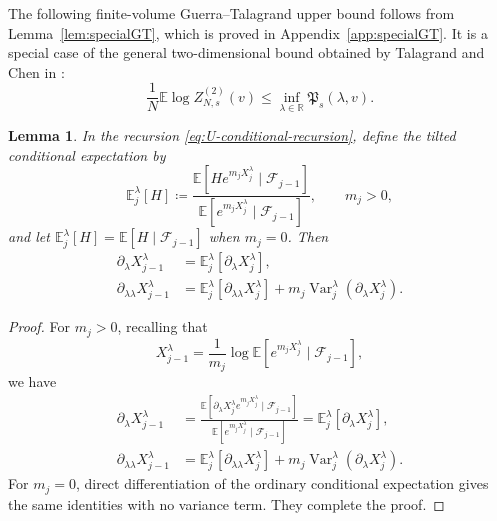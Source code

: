 \documentclass[11pt]{article}
\newtheorem{lemma}[theorem]{Lemma}
\numberwithin{equation}{section}
\newcommand{\E}{\mathbb{E}}
\newcommand{\1}{\mathbf 1}
\newcommand{\cK}{\mathcal K}
\begin{document}
The following finite-volume Guerra--Talagrand upper bound follows from Lemma~\ref{lem:specialGT}, which is proved in Appendix~\ref{app:specialGT}. It is a special case of the general two-dimensional bound obtained by Talagrand and Chen in \cite{Talagrand,ChenGT}:
\begin{equation}
 \frac1N\E\log Z^{(2)}_{N,s}(v)
 \le \inf_{\lambda\in \mathbb R} \mathfrak P_s(\lambda,v).
 \label{eq:GTfunctionalbound}
\end{equation}

\begin{lemma}
\label{lem:U-finite-step-derivatives}
In the recursion \eqref{eq:U-conditional-recursion}, define the tilted
conditional expectation by
\[
\E_j^\lambda[H]
\coloneqq
\frac{
\E\left[
H e^{m_jX_j^\lambda}\mid\mathcal F_{j-1}
\right]
}{
\E\left[
e^{m_jX_j^\lambda}\mid\mathcal F_{j-1}
\right]
},
\qquad m_j>0,
\]
and let $\E_j^\lambda[H]=\E[H\mid\mathcal F_{j-1}]$ when $m_j=0$.
Then
\begin{align}
\partial_\lambda X_{j-1}^\lambda
&=
\E_j^\lambda
\left[
\partial_\lambda X_j^\lambda
\right],
\label{eq:U-first-derivative-recursion}\\
\partial_{\lambda\lambda}X_{j-1}^\lambda
&=
\E_j^\lambda
\left[
\partial_{\lambda\lambda}X_j^\lambda
\right]
+
m_j
\operatorname{Var}_j^\lambda
\left(
\partial_\lambda X_j^\lambda
\right).
\label{eq:U-second-derivative-recursion}
\end{align}
\end{lemma}


\begin{proof}
For $m_j>0$, recalling that $$ X_{j-1}^\lambda= \displaystyle\frac1{m_j}\log\E\left[
 e^{m_jX_j^\lambda}\mid\mathcal F_{j-1}\right],$$
 we have 
\begin{align*}
 \partial_\lambda X_{j-1}^\lambda
 &=\frac{
\E\left[
\partial_\lambda X_j^\lambda e^{m_jX_j^\lambda}\mid\mathcal F_{j-1}
\right]
}{
\E\left[
e^{m_jX_j^\lambda}\mid\mathcal F_{j-1}
\right]}
= \E_j^\lambda[\partial_\lambda X_j^\lambda],\\
 \partial_{\lambda\lambda}X_{j-1}^\lambda
 &=\E_j^\lambda[\partial_{\lambda\lambda}X_j^\lambda]
   +m_j\operatorname{Var}_j^\lambda
       (\partial_\lambda X_j^\lambda).
\end{align*}
For $m_j=0$, direct differentiation of the ordinary conditional
expectation gives the same identities with no variance term.  They complete the proof. 
\end{proof}
\end{document}

